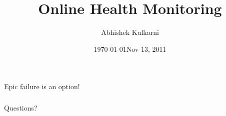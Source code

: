 \documentclass[compress,blue]{beamer}
\date{\today}
\title{Online Health Monitoring}
\author{Abhishek Kulkarni}
\institute[Indiana University]{\\ Lab Lunch Talk\\ \tiny Open Systems Lab}
\date{Nov 13, 2011}
\begin{document}
\frame{\titlepage}





\begin{frame}
 \frametitle{}
  

\begin{center}
\huge Epic failure is an option!
\end{center}

  
\end{frame}
\begin{frame}
 \frametitle{}
  


\begin{center}
\huge Questions?
\end{center}

  
\end{frame}
\end{document}
